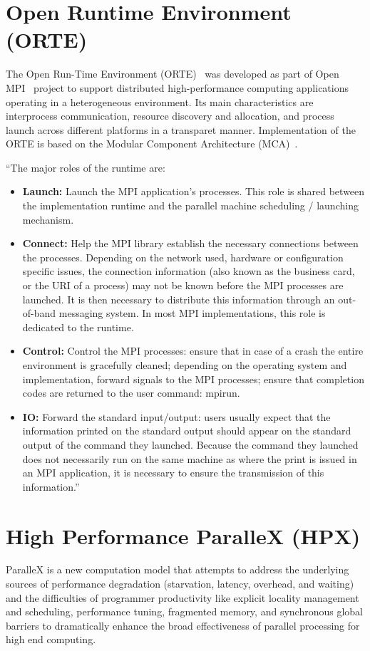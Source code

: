 \section{Open Runtime Environment (ORTE)}
\label{sec:orte}
The Open Run-Time Environment (ORTE)~\cite{Castain2008153} was developed as part of Open MPI~\cite{gabriel04:_open_mpi} project to support distributed high-performance computing applications operating in a heterogeneous environment. Its main characteristics are interprocess communication, resource discovery and allocation, and process launch across different platforms in a transparet manner. Implementation of the ORTE is based on the Modular Component Architecture (MCA)~\cite{gabriel04:_open_mpi}.

``The major roles of the runtime are:
\begin{itemize}
\item \textbf{Launch:} Launch the MPI application’s processes. This role is shared between the implementation runtime and the parallel machine scheduling / launching mechanism.
\item \textbf{Connect:} Help the MPI library establish the necessary connections between the processes. Depending on the network used, hardware or configuration specific issues, the connection information (also known as the business card, or the URI of
a process) may not be known before the MPI processes are launched. It is then necessary to distribute this information through an out-of-band messaging system. In most MPI implementations, this role is dedicated to the runtime.
\item \textbf{Control:} Control the MPI processes: ensure that in case of a crash the entire environment is gracefully cleaned; depending on the operating system and implementation, forward signals to the MPI processes; ensure that completion codes
are returned to the user command: mpirun.
\item \textbf{IO:} Forward the standard input/output: users usually expect that the information printed on the standard output should appear on the standard output of the command they launched. Because the command they launched does not necessarily run on the same machine as where the print is issued in an MPI application, it is necessary to ensure the transmission of this information.''~\cite{bosilca2011scalability}
\end{itemize}

\section{High Performance ParalleX (HPX)}
\label{sec:hpx}
ParalleX is a new computation model that attempts to address the underlying sources of performance degradation (starvation, latency, overhead, and waiting) and the difficulties of programmer productivity like explicit locality management and scheduling, performance tuning, fragmented memory, and synchronous global barriers to dramatically enhance the broad effectiveness of parallel processing for high end computing.~\cite{4228212}




